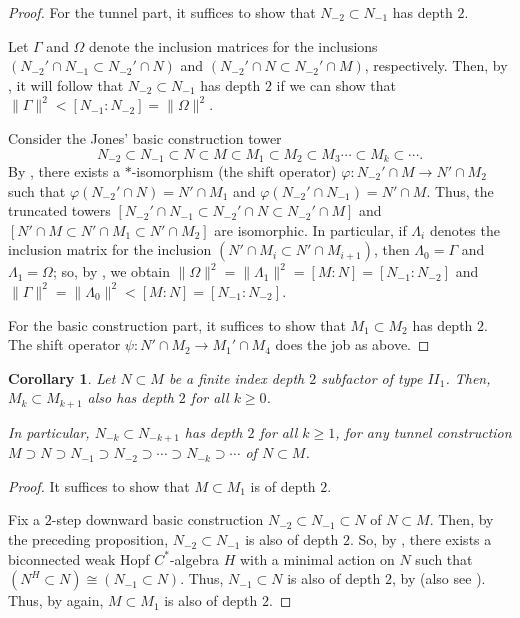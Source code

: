 \documentclass{amsart}
\newtheorem{corollary}[theorem]{Corollary}
\theoremstyle{definition}
\theoremstyle{theorem}
\newcommand{\rar}{\rightarrow}
\begin{document}
\begin{proof}
  For the tunnel part, it suffices to show that $N_{-2}\subset N_{-1}$
  has depth $2$.

  Let $\Gamma$ and $\Omega$ denote the inclusion matrices for the
inclusions $(N_{-2}'\cap N_{-1} \subset N_{-2}'\cap N )$ and
$(N_{-2}'\cap N \subset N_{-2}'\cap M )$, respectively. Then, by
\cite[Theorem 4.6.3]{GHJ}, it will follow that $N_{-2} \subset N_{-1}$
has depth $2$ if we can show that $\|\Gamma\|^2 < [N_{-1}: N_{-2}] =
\|\Omega\|^2 $.

Consider the Jones' basic construction tower
  \[
N_{-2} \subset N_{-1} \subset N \subset M \subset M_1 \subset M_2 \subset M_3 \cdots \subset M_k \subset \cdots.
\]
By \cite[Theorem 2.13]{Bis}, there exists a $*$-isomorphism (the shift
operator) $\varphi: N_{-2}' \cap M \rar N'\cap M_2$ such that
$\varphi(N_{-2}'\cap N) = N'\cap M_1 $ and $\varphi(N_{-2}'\cap
N_{-1}) = N'\cap M $.  Thus, the truncated towers \( [N_{-2}'\cap
  N_{-1} \subset N_{-2}'\cap N \subset N_{-2}'\cap M ] \) and \(
[N'\cap M \subset N'\cap M_1 \subset N'\cap M_2] \) are isomorphic.
In particular, if $\Lambda_i$ denotes the inclusion matrix for the
inclusion $(N'\cap M_i \subset N'\cap M_{i+1} )$, then $\Lambda_0 =
\Gamma$ and $\Lambda_1 = \Omega$; so, by \cite[Theorem 4.6.3]{GHJ}, we
obtain \( \|\Omega\|^2 = \|\Lambda_1\|^2 = [M:N]= [N_{-1}: N_{-2}] \)
and \( \|\Gamma\|^2 = \|\Lambda_0\|^2 < [M:N] = [N_{-1}:N_{-2}]  \).\smallskip

For the basic construction part, it suffices to show that $M_1\subset
M_2$ has depth $2$. The shift operator $\psi: N'\cap M_2 \rar
M_1'\cap M_{4}$ does the job as above.
\end{proof}

\begin{corollary}\label{dual-depth-2}
  Let $N\subset M$ be a finite index depth $2$ subfactor of type $II_1$. Then, $M_k
  \subset M_{k+1}$ also has depth $2$ for all $k \geq 0$.

  In particular, $N_{-k}\subset N_{-k +1}$ has depth $2$ for all $k
  \geq 1$, for any tunnel construction $M \supset N \supset
  N_{-1}\supset N_{-2}\supset \cdots \supset N_{-k} \supset \cdots$ of
  $N \subset M$.
  \end{corollary}
\begin{proof}
It suffices to show that $M \subset M_1$ is of depth $2$.

Fix a $2$-step downward basic construction $N_{-2}\subset N_{-1}
\subset N$ of $N \subset M$. Then, by the preceding proposition,
$N_{-2} \subset N_{-1}$ is also of depth $2$. So, by \cite{NV1}, there
exists a biconnected weak Hopf $C^*$-algebra $H$ with a minimal action
on $N$ such that $(N^H \subset N)\cong (N_{-1} \subset N)$. Thus,
$N_{-1} \subset N$ is also of depth $2$, by \cite{BNS} (also see
\cite[Section 8.1]{NV2}). Thus, by  again,
$M\subset M_1$ is also of depth $2$.
  \end{proof}
\end{document}
